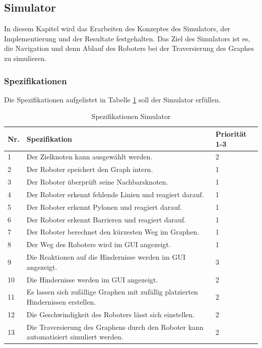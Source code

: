 \subsection{Simulator}

In diesem Kapitel wird das Erarbeiten des Konzeptes des Simulators, der Implementierung und der Resultate festgehalten. Das Ziel des Simulators ist es, die Navigation und denn Ablauf des Roboters bei der Traversierung des Graphes zu simulieren.


\subsubsection{Spezifikationen}

Die Spezifikationen aufgelistet in Tabelle \ref{table:spezifikation-simulator} soll der Simulator erfüllen.

\begin{table}[H]
\centering
\small
\begin{tabularx}{\textwidth}{|l|X|l|}
\hline
  \textbf{Nr.} & \textbf{Spezifikation} & \textbf{Priorität 1-3}  \\
  \hline
  1  & Der Zielknoten kann ausgewählt werden. &  2\\
  \hline
   2   & Der Roboter speichert den Graph intern.  & 1\\
  \hline
   3 & Der Roboter überprüft seine Nachbarsknoten.&1\\
  \hline
  4 & Der Roboter erkennt fehlende Linien und reagiert darauf. & 1\\
  \hline
  5 &   Der Roboter erkennt Pylonen und reagiert darauf. & 1\\
  \hline
   6  &   Der Roboter erkennt Barrieren und reagiert darauf. & 1\\
  \hline
    7 &   Der Roboter berechnet den kürzesten Weg im Graphen.& 1\\
  \hline
     8  &   Der Weg des Roboters wird im GUI angezeigt. & 1\\
  \hline
      9   &   Die Reaktionen auf die Hindernisse werden im GUI angezeigt. & 3\\
  \hline
 10   &   Die Hindernisse werden im GUI angezeigt. & 2\\
  \hline
   11   &   Es lassen sich zufällige Graphen mit zufällig platzierten Hindernissen erstellen. & 2\\
  \hline
   12   &   Die Geschwindigkeit des Roboters lässt sich einstellen. & 2\\
  \hline
   13   &   Die Traversierung des Graphens durch den Roboter kann automatisiert simuliert werden. & 2\\
  \hline

\end{tabularx}
\caption{Spezifikationen Simulator}
\label{table:spezifikation-simulator}
\end{table}

